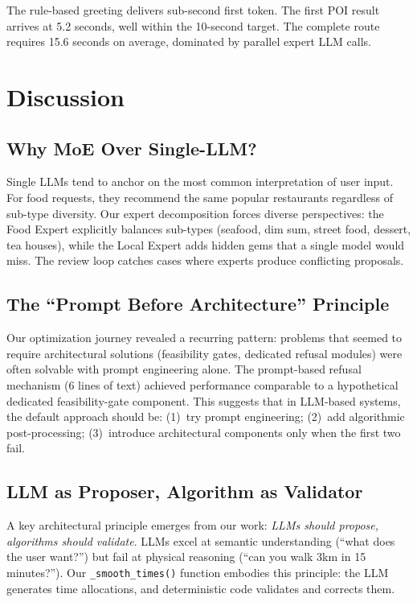 \documentclass[11pt]{article}
\begin{document}
The rule-based greeting delivers sub-second first token. The first POI result arrives at 5.2 seconds, well within the 10-second target. The complete route requires 15.6 seconds on average, dominated by parallel expert LLM calls.

\section{Discussion}

\subsection{Why MoE Over Single-LLM?}

Single LLMs tend to anchor on the most common interpretation of user input. For food requests, they recommend the same popular restaurants regardless of sub-type diversity. Our expert decomposition forces diverse perspectives: the Food Expert explicitly balances sub-types (seafood, dim sum, street food, dessert, tea houses), while the Local Expert adds hidden gems that a single model would miss. The review loop catches cases where experts produce conflicting proposals.

\subsection{The ``Prompt Before Architecture'' Principle}

Our optimization journey revealed a recurring pattern: problems that seemed to require architectural solutions (feasibility gates, dedicated refusal modules) were often solvable with prompt engineering alone. The prompt-based refusal mechanism (6 lines of text) achieved performance comparable to a hypothetical dedicated feasibility-gate component. This suggests that in LLM-based systems, the default approach should be: (1)~try prompt engineering; (2)~add algorithmic post-processing; (3)~introduce architectural components only when the first two fail.

\subsection{LLM as Proposer, Algorithm as Validator}

A key architectural principle emerges from our work: \textit{LLMs should propose, algorithms should validate}. LLMs excel at semantic understanding (``what does the user want?'') but fail at physical reasoning (``can you walk 3km in 15 minutes?''). Our \texttt{\_smooth\_times()} function embodies this principle: the LLM generates time allocations, and deterministic code validates and corrects them.
\end{document}
